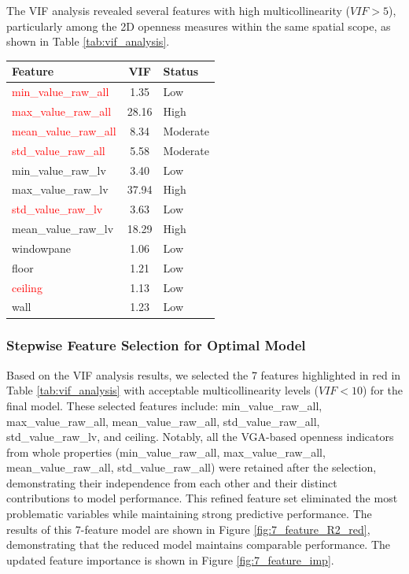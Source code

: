 The VIF analysis revealed several features with high multicollinearity ($VIF > 5$), particularly among 
the 2D openness measures within the same spatial scope, as shown in Table \ref{tab:vif_analysis}.
\begin{center}
    \begin{tabular}{l|c|l}
    \hline
    Feature & VIF & Status \\
    \hline
    \textcolor{red}{min\_value\_raw\_all} & 1.35 & Low \\
    \textcolor{red}{max\_value\_raw\_all} & 28.16 & High \\
    \textcolor{red}{mean\_value\_raw\_all} & 8.34 & Moderate \\
    \textcolor{red}{std\_value\_raw\_all} & 5.58 & Moderate \\
    min\_value\_raw\_lv & 3.40 & Low \\
    max\_value\_raw\_lv & 37.94 & High \\
    \textcolor{red}{std\_value\_raw\_lv} & 3.63 & Low \\
    mean\_value\_raw\_lv & 18.29 & High \\
    windowpane & 1.06 & Low \\
    floor & 1.21 & Low \\
    \textcolor{red}{ceiling} & 1.13 & Low \\
    wall & 1.23 & Low \\
    \hline
    \end{tabular}
    \label{tab:vif_analysis}
\end{center}

\subsubsection{Stepwise Feature Selection for Optimal Model}
Based on the VIF analysis results, we selected the 7 features highlighted in red in Table \ref{tab:vif_analysis} 
with acceptable multicollinearity levels ($VIF < 10$) for the final model. These selected features include: 
min\_value\_raw\_all, max\_value\_raw\_all, mean\_value\_raw\_all, std\_value\_raw\_all, std\_value\_raw\_lv, 
and ceiling. Notably, all the VGA-based openness indicators from whole properties 
(min\_value\_raw\_all, max\_value\_raw\_all, mean\_value\_raw\_all, std\_value\_raw\_all) were retained 
after the selection, demonstrating their independence from each other and their distinct contributions 
to model performance. This refined feature set eliminated the most problematic variables while 
maintaining strong predictive performance. The results of this 7-feature model are shown in 
Figure \ref{fig:7_feature_R2_red}, demonstrating that the reduced model maintains comparable 
performance. The updated feature importance is shown in Figure \ref{fig:7_feature_imp}.

